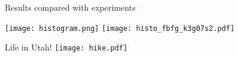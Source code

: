\documentclass[10pt]{beamer}
\begin{document}
\begin{frame}{Results compared with experiments}
\begin{center}
\texttt{[image: histogram.png]}
\texttt{[image: histo\_fbfg\_k3g07s2.pdf]}
\end{center}
\end{frame}

\begin{frame}{Life in Utah!}
\vspace{-3cm}
\texttt{[image: hike.pdf]}
\end{frame}
\end{document}
